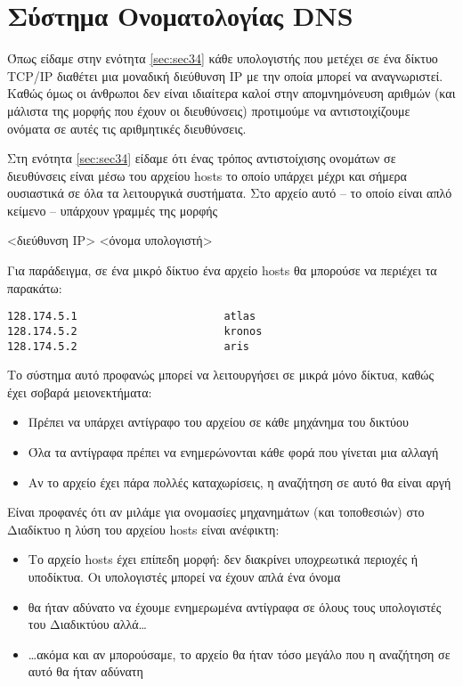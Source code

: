 %
%
\section{Σύστημα Ονοματολογίας DNS}
\label{sec:sec61}

Όπως είδαμε στην ενότητα \ref{sec:sec34} κάθε υπολογιστής που μετέχει σε ένα δίκτυο TCP/IP διαθέτει μια μοναδική διεύθυνση IP με την οποία μπορεί να αναγνωριστεί. Καθώς όμως οι άνθρωποι δεν είναι ιδιαίτερα καλοί στην απομνημόνευση αριθμών (και μάλιστα της μορφής που έχουν οι διευθύνσεις) προτιμούμε να αντιστοιχίζουμε ονόματα σε αυτές τις αριθμητικές διευθύνσεις. 

Στη ενότητα \ref{sec:sec34} είδαμε ότι ένας τρόπος αντιστοίχισης ονομάτων σε διευθύνσεις είναι μέσω του αρχείου hosts το οποίο υπάρχει μέχρι και σήμερα ουσιαστικά σε όλα τα λειτουργικά συστήματα. Στο αρχείο αυτό -- το οποίο είναι απλό κείμενο -- υπάρχουν γραμμές της μορφής 

\begin{center}
<διεύθυνση IP> \hspace{20mm} <όνομα υπολογιστή>
\end{center}

Για παράδειγμα, σε ένα μικρό δίκτυο ένα αρχείο hosts θα μπορούσε να περιέχει τα παρακάτω:

\begin{verbatim}
128.174.5.1                       atlas
128.174.5.2                       kronos
128.174.5.2                       aris
\end{verbatim}

Το σύστημα αυτό προφανώς μπορεί να λειτουργήσει σε μικρά μόνο δίκτυα, καθώς έχει σοβαρά μειονεκτήματα:

\begin{itemize}
\item Πρέπει να υπάρχει αντίγραφο του αρχείου σε κάθε μηχάνημα του δικτύου
\item Όλα τα αντίγραφα πρέπει να ενημερώνονται κάθε φορά που γίνεται μια αλλαγή
\item Αν το αρχείο έχει πάρα πολλές καταχωρίσεις, η αναζήτηση σε αυτό θα είναι αργή
\end{itemize}

Είναι προφανές ότι αν μιλάμε για ονομασίες μηχανημάτων (και τοποθεσιών) στο Διαδίκτυο η λύση του αρχείου hosts είναι ανέφικτη:

\begin{itemize}
\item Το αρχείο hosts έχει επίπεδη μορφή: δεν διακρίνει υποχρεωτικά περιοχές ή υποδίκτυα. Οι υπολογιστές μπορεί να έχουν απλά ένα όνομα
\item θα ήταν αδύνατο να έχουμε ενημερωμένα αντίγραφα σε όλους τους υπολογιστές του Διαδικτύου αλλά\ldots
\item \ldots{}ακόμα και αν μπορούσαμε, το αρχείο θα ήταν τόσο μεγάλο που η αναζήτηση σε αυτό θα ήταν αδύνατη
\end{itemize}

